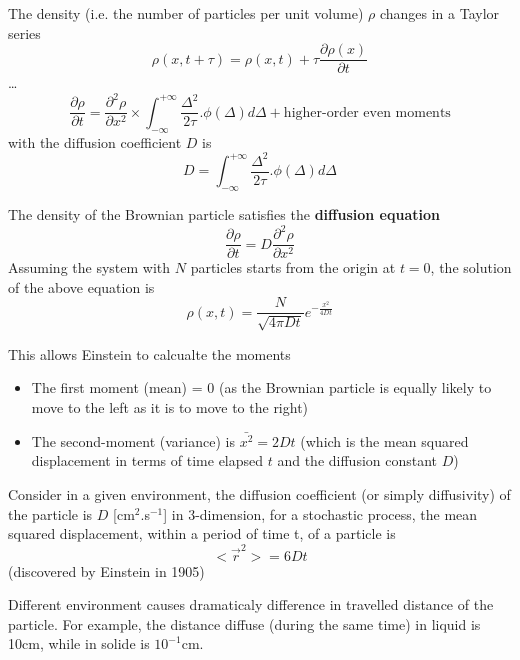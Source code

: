 The density (i.e. the number of particles per unit volume) $\rho$
changes in a Taylor series
\begin{equation}
\rho(x, t+\tau) = \rho(x, t) + \tau \frac{\partial \rho(x)}{\partial t}
\end{equation}
\ldots
\begin{equation}
\frac{\partial \rho}{\partial t} = \frac{\partial^2 \rho}{\partial x^2} \times
\int^{+\infty}_{-\infty} \frac{\Delta^2}{2\tau} .\phi(\Delta)d\Delta + \text{
higher-order even moments}
\end{equation}
with the diffusion coefficient $D$ is
\begin{equation}
D = \int^{+\infty}_{-\infty} \frac{\Delta^2}{2\tau} .\phi(\Delta)d\Delta 
\end{equation}

The density of the Brownian particle satisfies the {\bf diffusion equation}
\begin{equation}
\frac{\partial \rho}{\partial t} = D \frac{\partial^2 \rho}{\partial x^2}
\label{eq:Einstein_diffusion_eq} 
\end{equation}
Assuming the system with $N$ particles starts from the origin at $t=0$, the
solution of the above equation is
\begin{equation}
\rho(x, t) = \frac{N}{\sqrt{4\pi D t}} e^{-\frac{x^2}{4Dt}}
\end{equation}

This allows Einstein to calcualte the moments
\begin{itemize}
  \item The first moment (mean) = 0 (as the Brownian particle is equally likely
  to move to the left as it is to move to the right)
  
  \item The second-moment (variance) is $\bar{x^2} = 2Dt$ (which is the mean
  squared displacement in terms of time elapsed $t$ and the diffusion constant $D$)
\end{itemize}

Consider in a given environment, the diffusion coefficient (or simply
diffusivity) of the particle is $D$ [cm$^2$.s$^{-1}$] in 3-dimension,
for a stochastic process, the mean squared displacement, within a
period of time t, of a particle is
\begin{equation}
  \label{eq:Einstein.1905}
  <\overrightarrow r^2> = 6Dt
\end{equation}(discovered by Einstein in 1905)

Different environment causes dramaticaly difference in travelled
distance of the particle. For example, the distance diffuse (during
the same time) in liquid is 10cm, while in solide is $10^{-1}$cm.

